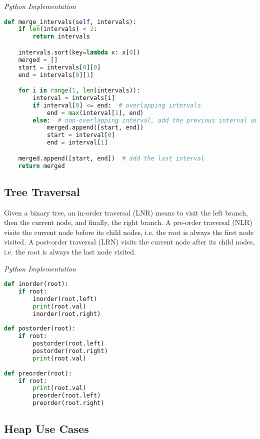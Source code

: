 \documentclass{article}
\begin{document}
\vspace{8pt} \emph{Python Implementation}
\begin{lstlisting}[language=Python]
def merge_intervals(self, intervals):
    if len(intervals) < 2:
        return intervals

    intervals.sort(key=lambda x: x[0])
    merged = []
    start = intervals[0][0]
    end = intervals[0][1]

    for i in range(1, len(intervals)):
        interval = intervals[i]
        if interval[0] <= end:  # overlapping intervals
            end = max(interval[1], end)
        else:  # non-overlapping interval, add the previous interval and reset
            merged.append([start, end])
            start = interval[0]
            end = interval[1]

    merged.append([start, end])  # add the last interval
    return merged
\end{lstlisting}
    
    \subsection{Tree Traversal}
    Given a binary tree, an in-order traversal (LNR) means to visit the left branch, then the current node, and finally, the right branch. A pre-order traversal (NLR) visits the current node before its child nodes, i.e. the root is always the first node visited. A post-order traversal (LRN) visits the current node after its child nodes, i.e. the root is always the last node visited.

\vspace{8pt} \emph{Python Implementation}
\begin{lstlisting}[language=Python]  
def inorder(root): 
    if root: 
        inorder(root.left) 
        print(root.val)
        inorder(root.right) 
  
def postorder(root): 
    if root: 
        postorder(root.left) 
        postorder(root.right) 
        print(root.val)
        
def preorder(root): 
    if root: 
        print(root.val)
        preorder(root.left) 
        preorder(root.right) 
\end{lstlisting}
 
    \subsection{Heap Use Cases}
\end{document}
